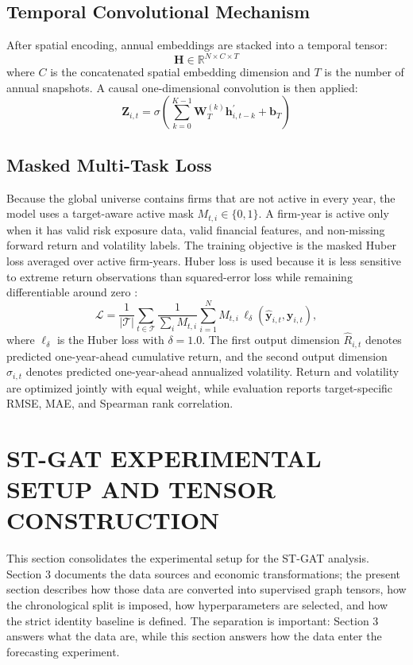 \documentclass[11pt, a4paper]{article}
\begin{document}
\subsection{Temporal Convolutional Mechanism}
After spatial encoding, annual embeddings are stacked into a temporal tensor:
\begin{equation}
\mathbf{H} \in \mathbb{R}^{N\times C\times T}
\end{equation}
where $C$ is the concatenated spatial embedding dimension and $T$ is the number of annual snapshots. A causal one-dimensional convolution is then applied:
\begin{equation}
\mathbf{Z}_{i,t} = \sigma\left(\sum_{k=0}^{K-1}\mathbf{W}_{T}^{(k)}\mathbf{h}_{i,t-k}^{\prime}+\mathbf{b}_{T}\right)
\end{equation}

\subsection{Masked Multi-Task Loss}
Because the global universe contains firms that are not active in every year, the model uses a target-aware active mask $M_{t,i}\in\{0,1\}$. A firm-year is active only when it has valid risk exposure data, valid financial features, and non-missing forward return and volatility labels. The training objective is the masked Huber loss averaged over active firm-years. Huber loss is used because it is less sensitive to extreme return observations than squared-error loss while remaining differentiable around zero \citep{huber1964robust}:
\begin{equation}
\mathcal{L}=\frac{1}{|\mathcal{T}|}\sum_{t\in\mathcal{T}}\frac{1}{\sum_i M_{t,i}}\sum_{i=1}^{N}M_{t,i}\,\ell_{\delta}\left(\hat{\mathbf{y}}_{i,t},\mathbf{y}_{i,t}\right),
\end{equation}
where $\ell_{\delta}$ is the Huber loss with $\delta=1.0$. The first output dimension $\widehat{R}_{i,t}$ denotes predicted one-year-ahead cumulative return, and the second output dimension $\widehat{\sigma}_{i,t}$ denotes predicted one-year-ahead annualized volatility. Return and volatility are optimized jointly with equal weight, while evaluation reports target-specific RMSE, MAE, and Spearman rank correlation.

\section{ST-GAT EXPERIMENTAL SETUP AND TENSOR CONSTRUCTION}
This section consolidates the experimental setup for the ST-GAT analysis. Section 3 documents the data sources and economic transformations; the present section describes how those data are converted into supervised graph tensors, how the chronological split is imposed, how hyperparameters are selected, and how the strict identity baseline is defined. The separation is important: Section 3 answers what the data are, while this section answers how the data enter the forecasting experiment.
\end{document}
